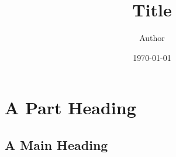 \documentclass[11pt]{book}
\title{\bf Title}
\author{Author}
\date{\today}
\begin{document}
\frontmatter
\maketitle
\tableofcontents
\mainmatter

\part{A Part Heading}
\chapter{A Main Heading}
 
\end{document}
